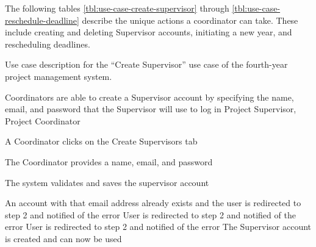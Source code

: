 The following tables \ref{tbl:use-case-create-supervisor} through \ref{tbl:use-case-reschedule-deadline} describe the unique actions a coordinator can take. These include creating and deleting Supervisor accounts, initiating a new year, and rescheduling deadlines.


\begin{table}
  \centering
  \caption{Use case description for the ``Create Supervisor'' use case of the fourth-year project management system.}
  \label{tbl:use-case-create-supervisor}

  \begin{usecase}
    Coordinators are able to create a Supervisor account by specifying the name, email, and password that the Supervisor will use to log in
    Project Supervisor, Project Coordinator
    \ucnormal
    \begin{ucenum}
      \item A Coordinator clicks on the Create Supervisors tab
      \item The Coordinator provides a name, email, and password
      \item The system validates and saves the supervisor account
    \end{ucenum}
    An account with that email address already exists and the user is redirected to step 2 and notified of the error
    User is redirected to step 2 and notified of the error
    User is redirected to step 2 and notified of the error
    The Supervisor account is created and can now be used
  \end{usecase}
\end{table}


